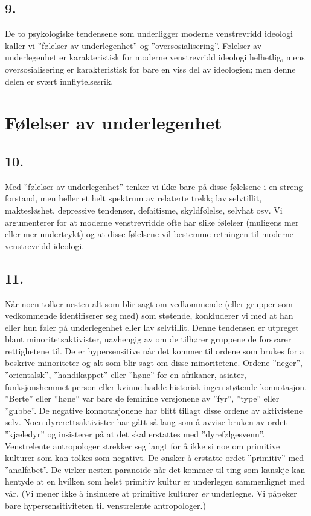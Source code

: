 \documentclass[oneside]{book}
\begin{document}
\section*{9.}
De to psykologiske tendensene som underligger moderne venstrevridd ideologi kaller vi ''følelser av underlegenhet'' og ''oversosialisering''. Følelser av underlegenhet er karakteristisk for moderne venstrevridd ideologi helhetlig, mens oversosialisering er karakteristisk for bare en viss del av ideologien; men denne delen er svært innflytelsesrik.

\chapter{Følelser av underlegenhet}

\section*{10.}
Med ''følelser av underlegenhet'' tenker vi ikke bare på disse følelsene i en streng forstand, men heller et helt spektrum av relaterte trekk; lav selvtillit, maktesløshet, depressive tendenser, defaitisme, skyldfølelse, selvhat osv. Vi argumenterer for at moderne venstrevridde ofte har slike følelser (muligens mer eller mer undertrykt) og at disse følelsene vil bestemme retningen til moderne venstrevridd ideologi.

\section*{11.}
Når noen tolker nesten alt som blir sagt om vedkommende (eller grupper som vedkommende identifiserer seg med) som støtende, konkluderer vi med at han eller hun føler på underlegenhet eller lav selvtillit. Denne tendensen er utpreget blant minoritetsaktivister, uavhengig av om de tilhører gruppene de forsvarer rettighetene til. De er hypersensitive når det kommer til ordene som brukes for a beskrive minoriteter og alt som blir sagt om disse minoritetene. Ordene ''neger'', ''orientalsk'', ''handikappet'' eller ''høne'' for en afrikaner, asiater, funksjonshemmet person eller kvinne hadde historisk ingen støtende konnotasjon. ''Berte'' eller ''høne'' var bare de feminine versjonene av ''fyr'', ''type'' eller ''gubbe''. De negative konnotasjonene har blitt tillagt disse ordene av aktivistene selv. Noen dyrerettsaktivister har gått så lang som å avvise bruken av ordet ''kjæledyr'' og insisterer på at det skal erstattes med ''dyrefølgesvenn''. Venstrelente antropologer strekker seg langt for å ikke si noe om primitive kulturer som kan tolkes som negativt. De ønsker å erstatte ordet ''primitiv'' med ''analfabet''. De virker nesten paranoide når det kommer til ting som kanskje kan hentyde at en hvilken som helst primitiv kultur er underlegen sammenlignet med vår. (Vi mener ikke å insinuere at primitive kulturer {\em er} underlegne. Vi påpeker bare hypersensitiviteten til venstrelente antropologer.)
\end{document}
